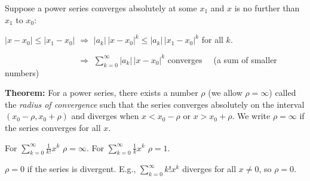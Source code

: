 \documentclass[10pt,aspectratio=169]{beamer}
\begin{document}
\begin{frame}

Suppose a power series converges absolutely at some $x_1$
and $x$ is no further than $x_1$ to $x_0$:

\medskip

\qquad
$\lvert x - x_0  \rvert \leq \lvert x_1 - x_0 \rvert$
\pause
\qquad
$\Rightarrow$
\qquad
$\lvert a_k \rvert \, {\lvert x-x_0\rvert }^k \leq \lvert a_k \rvert
\, {\lvert x_1-x_0 \rvert}^k$ \quad for all $k$.

\pause
\medskip

\qquad
$\phantom{\lvert x - x_0  \rvert \leq \lvert x_1 - x_0 \rvert}$
\qquad
$\Rightarrow$
\qquad
$\displaystyle
\sum_{k=0}^\infty \lvert a_k \rvert \, {\lvert x-x_0\rvert }^k$
\quad
converges ~~{\small (a sum of smaller numbers)}

\pause
\medskip

\textbf{Theorem:}
For a power series, there exists a number
$\rho$ (we allow $\rho=\infty$)
called the \emph{radius of convergence} such that
the series converges absolutely on the interval
$(x_0-\rho,x_0+\rho)$ and diverges when $x < x_0-\rho$ or $x > x_0+\rho$.
We write $\rho=\infty$ if
the series converges for all $x$.

\begin{center}
\end{center}

\pause
\vspace*{-5pt}

For
\quad
$\displaystyle
\sum_{k=0}^\infty \frac{1}{k!} x^k$
\quad
$\rho = \infty$.
\qquad
\pause
For
\quad
$\displaystyle
\sum_{k=0}^\infty \frac{1}{k} x^k$
\quad
$\rho = 1$.

\pause
\vspace*{-5pt}

$\rho = 0$ if the series is
divergent.
\qquad
E.g.,
\quad
$\displaystyle
\sum_{k=0}^\infty k! x^k$
\quad
diverges for all $x \neq 0$,
so $\rho=0$.

\end{frame}
\end{document}
